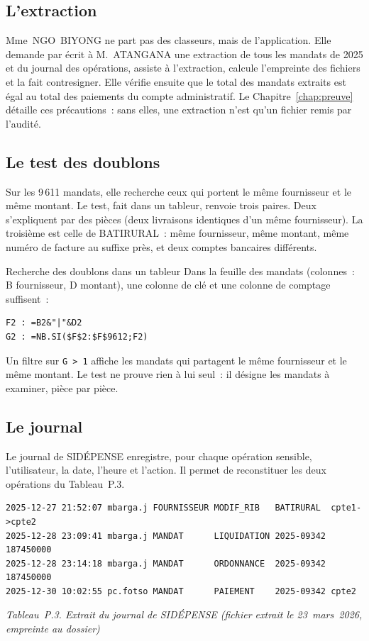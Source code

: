 \subsection{L'extraction}

Mme~NGO~BIYONG ne part pas des classeurs, mais de l'application. Elle
demande par écrit à M.~ATANGANA une extraction de tous les mandats de 2025
et du journal des opérations, assiste à l'extraction, calcule l'empreinte
des fichiers et la fait contresigner. Elle vérifie ensuite que le total des
mandats extraits est égal au total des paiements du compte administratif.
Le Chapitre~\ref{chap:preuve} détaille ces précautions~: sans elles, une
extraction n'est qu'un fichier remis par l'audité.

\subsection{Le test des doublons}

Sur les 9\,611 mandats, elle recherche ceux qui portent le même
fournisseur et le même montant. Le test, fait dans un tableur, renvoie
trois paires. Deux s'expliquent par des pièces (deux livraisons identiques
d'un même fournisseur). La troisième est celle de BATIRURAL~: même
fournisseur, même montant, même numéro de facture au suffixe près, et deux
comptes bancaires différents.

\begin{boxoutils}{Recherche des doublons dans un tableur}
Dans la feuille des mandats (colonnes~: B fournisseur, D montant), une
colonne de clé et une colonne de comptage suffisent~:
\begin{lstlisting}
F2 : =B2&"|"&D2
G2 : =NB.SI($F$2:$F$9612;F2)
\end{lstlisting}
Un filtre sur \texttt{G~>~1} affiche les mandats qui partagent le même
fournisseur et le même montant. Le test ne prouve rien à lui seul~: il
désigne les mandats à examiner, pièce par pièce.
\end{boxoutils}

\subsection{Le journal}

Le journal de SIDÉPENSE enregistre, pour chaque opération sensible,
l'utilisateur, la date, l'heure et l'action. Il permet de reconstituer
les deux opérations du Tableau~P.3.

\begin{lstlisting}[basicstyle=\ttfamily\scriptsize]
2025-12-27 21:52:07 mbarga.j FOURNISSEUR MODIF_RIB   BATIRURAL  cpte1->cpte2
2025-12-28 23:09:41 mbarga.j MANDAT      LIQUIDATION 2025-09342 187450000
2025-12-28 23:14:18 mbarga.j MANDAT      ORDONNANCE  2025-09342 187450000
2025-12-30 10:02:55 pc.fotso MANDAT      PAIEMENT    2025-09342 cpte2
\end{lstlisting}
\vspace{-0.6em}
\begin{center}{\small\itshape Tableau~P.3. Extrait du journal de SIDÉPENSE
(fichier extrait le 23~mars~2026, empreinte au dossier)}\end{center}

